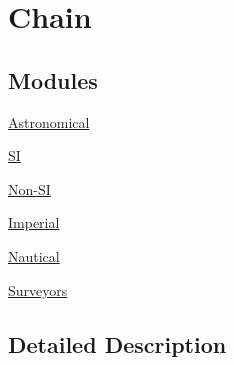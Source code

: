 \hypertarget{group___e_g_x_math-_conversions-_length_conversions-_imperial-_chain}{}\section{Chain}
\label{group___e_g_x_math-_conversions-_length_conversions-_imperial-_chain}
\subsection*{Modules}
\begin{DoxyCompactItemize}
\item 
\mbox{\hyperlink{group___e_g_x_math-_conversions-_length_conversions-_imperial-_chain-_astronomical}{Astronomical}}
\item 
\mbox{\hyperlink{group___e_g_x_math-_conversions-_length_conversions-_imperial-_chain-_s_i}{SI}}
\item 
\mbox{\hyperlink{group___e_g_x_math-_conversions-_length_conversions-_imperial-_chain-_non-_s_i}{Non-\/\+SI}}
\item 
\mbox{\hyperlink{group___e_g_x_math-_conversions-_length_conversions-_imperial-_chain-_imperial}{Imperial}}
\item 
\mbox{\hyperlink{group___e_g_x_math-_conversions-_length_conversions-_imperial-_chain-_nautical}{Nautical}}
\item 
\mbox{\hyperlink{group___e_g_x_math-_conversions-_length_conversions-_imperial-_chain-_surveyors}{Surveyors}}
\end{DoxyCompactItemize}


\subsection{Detailed Description}
